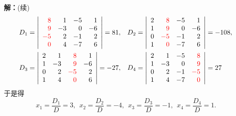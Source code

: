 \begin{frame}
  \begin{footnotesize}
    \textbf{解：}(续)
    $$
    \begin{array}{ll}
      D_1 = \left|
      \begin{array}{rrrr}
        \textcolor{red}{8}  &  1 & -5 &  1\\
        \textcolor{red}{9}  & -3 &  0 & -6\\
        \textcolor{red}{-5} &  2 & -1 &  2\\
        \textcolor{red}{0}  &  4 & -7 &  6
      \end{array}
      \right|= 81, &
      D_2 = \left|
      \begin{array}{rrrr}
        2 & \textcolor{red}{8}  & -5 &  1\\
        1 & \textcolor{red}{9}  &  0 & -6\\
        0 & \textcolor{red}{-5} & -1 &  2\\
        1 & \textcolor{red}{0}  & -7 &  6
      \end{array}
      \right|=-108,\\[0.8cm]
      D_3 = \left|
      \begin{array}{rrrr}
        2  &  1 & \textcolor{red}{8}  &  1\\
        1  & -3 & \textcolor{red}{9}  & -6\\
        0  &  2 & \textcolor{red}{-5} &  2\\
        1  &  4 & \textcolor{red}{0}  &  6
      \end{array}
      \right|= -27, &
      D_4 = \left|
      \begin{array}{rrrr}
        2 &  1 & -5 & \textcolor{red}{8} \\
        1 & -3 &  0 & \textcolor{red}{9} \\
        0 &  2 & -1 & \textcolor{red}{-5}\\
        1 &  4 & -7 & \textcolor{red}{0} 
      \end{array}
      \right|= 27
    \end{array}
    $$
    于是得
    $$
    x_1 = \frac{D_1}D = 3,  \ \ 
    x_2 = \frac{D_2}D = -4, \ \ 
    x_3 = \frac{D_3}D = -1, \ \ 
    x_4 = \frac{D_4}D = 1.
    $$
  \end{footnotesize}
\end{frame}


